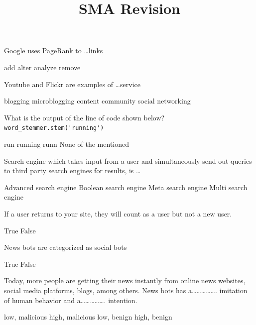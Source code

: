 \documentclass[theme=sleek, randomorder, hidesidemenu]{webquiz}
\title{SMA Revision}
\begin{document}
\begin{question}
  Google uses PageRank to \ldots links
  \begin{choice}[columns=2]
    \incorrect add
    \incorrect alter
    \correct analyze
    \incorrect remove
  \end{choice}
\end{question}

\begin{question}
  Youtube and Flickr are examples of \ldots service
  \begin{choice}[columns=2]
    \incorrect blogging
    \incorrect microblogging
    \correct content community
    \incorrect social networking
  \end{choice}
\end{question}

\begin{question}
  What is the output of the line of code shown below?\\
  \verb|word_stemmer.stem('running')|
  \begin{choice}
    \correct run
    \incorrect running
    \incorrect runn
    \incorrect None of the mentioned
  \end{choice}
\end{question}

\begin{question}
Search engine which takes input from a user and simultaneously send out
queries to third party search engines for results, is \ldots
\begin{choice}
  \incorrect Advanced search engine
  \incorrect Boolean search engine
  \correct Meta search engine
  \incorrect Multi search engine
\end{choice}
\end{question}

\begin{question}
  If a user returns to your site, they will count as a user but not a new user.
  \begin{choice}
    \correct True
    \incorrect False
  \end{choice}
\end{question}

\begin{question}
News bots are categorized as social bots
\begin{choice}[columns=2]
  \incorrect True
  \correct False
\end{choice}
\end{question}

\begin{question}
  Today, more people are getting their news instantly from online news
websites, social media platforms, blogs, among others. News bots has
a……………. imitation of human behavior and a……………. intention.

\begin{choice}[columns=2]
  \incorrect low, malicious
  \incorrect high, malicious
  \correct low, benign
  \incorrect high, benign
\end{choice}
\end{question}
\end{document}
